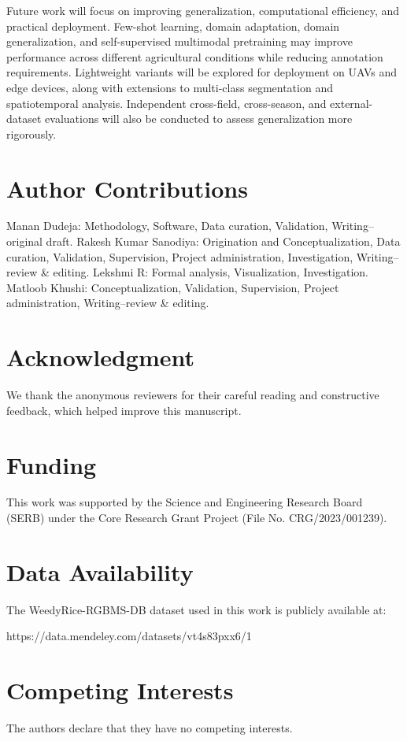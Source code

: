 \documentclass[pdflatex,sn-mathphys-num]{sn-jnl}
\newcommand{\rev}[1]{{\color{revisionblue}#1}}
\begin{document}
Future work will focus on improving generalization, computational efficiency, and practical deployment. Few-shot learning, domain adaptation, domain generalization, and self-supervised multimodal pretraining may improve performance across different agricultural conditions while reducing annotation requirements. Lightweight variants will be explored for deployment on UAVs and edge devices, along with extensions to multi-class segmentation and spatiotemporal analysis. \rev{Independent cross-field, cross-season, and external-dataset evaluations will also be conducted to assess generalization more rigorously.}

\section*{Author Contributions}

Manan Dudeja: Methodology, Software, Data curation, Validation, Writing--original draft.
Rakesh Kumar Sanodiya: Origination and Conceptualization, Data curation, Validation, Supervision, Project administration, Investigation, Writing--review \& editing.
Lekshmi R: Formal analysis, Visualization, Investigation.
Matloob Khushi: Conceptualization, Validation, Supervision, Project administration, Writing--review \& editing.

\section*{Acknowledgment}
We thank the anonymous reviewers for their careful reading and constructive feedback, which helped improve this manuscript.

\section*{Funding}
This work was supported by the
Science and Engineering Research Board (SERB)
under the Core Research Grant Project (File No. 
CRG/2023/001239). 

\section*{Data Availability}

The WeedyRice-RGBMS-DB dataset used in this work is publicly available at: 

https://data.mendeley.com/datasets/vt4s83pxx6/1

\section*{Competing Interests}

The authors declare that they have no competing interests.



\end{document}
